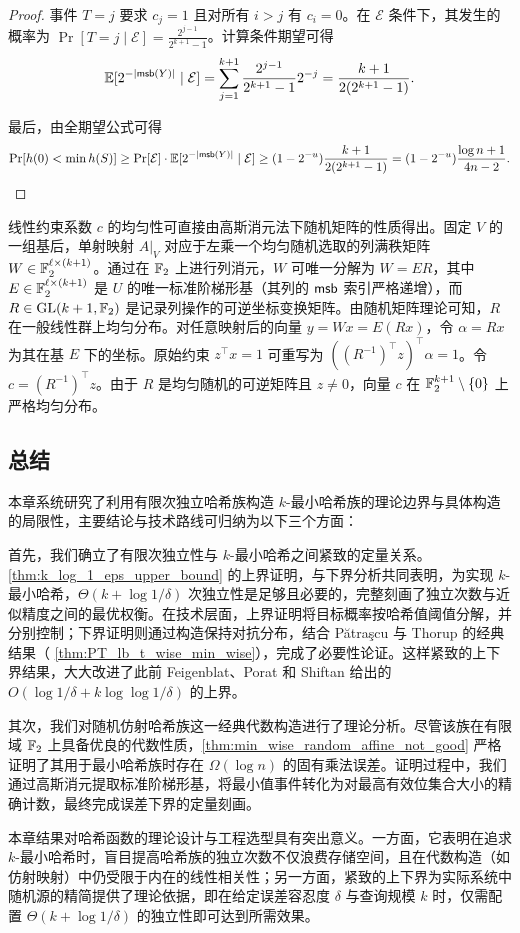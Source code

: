 \begin{proof}
    事件 $T = j$ 要求 $c_j = 1$ 且对所有 $i > j$ 有 $c_i = 0$。在 $\mathcal{E}$ 条件下，其发生的概率为 $\Pr[T = j \mid \mathcal{E}] = \frac{2^{j-1}}{2^{k+1}-1}$。计算条件期望可得
    $$
    \operatorname*{\mathbb{E}}[2^{-|\mathsf{msb}(Y)|} \mid \mathcal{E}] = \sum_{j=1}^{k+1} \frac{2^{j-1}}{2^{k+1}-1} 2^{-j} = \frac{k+1}{2(2^{k+1}-1)}.
    $$
    
    最后，由全期望公式可得
    $$
    \Pr[h(0) < \min h(S)] \ge \Pr[\mathcal{E}] \cdot \operatorname*{\mathbb{E}}[2^{-|\mathsf{msb}(Y)|} \mid \mathcal{E}] \ge (1 - 2^{-u}) \frac{k+1}{2(2^{k+1}-1)} = (1 - 2^{-u}) \frac{\log n + 1}{4 n - 2}.
    $$
\end{proof}

\begin{remark}\label{rmk:QR_induce_constraint_uniform}
    线性约束系数 $c$ 的均匀性可直接由高斯消元法下随机矩阵的性质得出。固定 $V$ 的一组基后，单射映射 $A|_V$ 对应于左乘一个均匀随机选取的列满秩矩阵 $W \in \mathbb{F}_2^{\ell \times (k+1)}$。通过在 $\mathbb{F}_2$ 上进行列消元，$W$ 可唯一分解为 $W = E R$，其中 $E \in \mathbb{F}_2^{\ell \times (k+1)}$ 是 $U$ 的唯一标准阶梯形基（其列的 $\mathsf{msb}$ 索引严格递增），而 $R \in \mathrm{GL}(k+1, \mathbb{F}_2)$ 是记录列操作的可逆坐标变换矩阵。由随机矩阵理论可知，$R$ 在一般线性群上均匀分布。对任意映射后的向量 $y = Wx = E(Rx)$，令 $\alpha = Rx$ 为其在基 $E$ 下的坐标。原始约束 $z^\top x = 1$ 可重写为 $((R^{-1})^\top z)^\top \alpha = 1$。令 $c = (R^{-1})^\top z$。由于 $R$ 是均匀随机的可逆矩阵且 $z \neq 0$，向量 $c$ 在 $\mathbb{F}_2^{k+1} \setminus \{0\}$ 上严格均匀分布。
\end{remark}

\subsection{总结}

本章系统研究了利用有限次独立哈希族构造 $k$-最小哈希族的理论边界与具体构造的局限性，主要结论与技术路线可归纳为以下三个方面：

首先，我们确立了有限次独立性与 $k$-最小哈希之间紧致的定量关系。\cref{thm:k_log_1_eps_upper_bound} 的上界证明，与下界分析共同表明，为实现 $k$-最小哈希，$\Theta(k + \log 1 / \delta)$ 次独立性是足够且必要的，完整刻画了独立次数与近似精度之间的最优权衡。在技术层面，上界证明将目标概率按哈希值阈值分解，并分别控制；下界证明则通过构造保持对抗分布，结合 P{\u{a}}tra{\c{s}}cu 与 Thorup \cite{PT_lb_t_wise_min_wise}的经典结果（ \cref{thm:PT_lb_t_wise_min_wise}），完成了必要性论证。这样紧致的上下界结果，大大改进了此前 Feigenblat、Porat 和 Shiftan \cite{minwise_FPS11} 给出的 $O(\log 1 / \delta + k \log \log 1 / \delta)$ 的上界。

其次，我们对随机仿射哈希族这一经典代数构造进行了理论分析。尽管该族在有限域 $\mathbb{F}_2$ 上具备优良的代数性质，\cref{thm:min_wise_random_affine_not_good} 严格证明了其用于最小哈希族时存在 $\Omega(\log n)$ 的固有乘法误差。证明过程中，我们通过高斯消元提取标准阶梯形基，将最小值事件转化为对最高有效位集合大小的精确计数，最终完成误差下界的定量刻画。

本章结果对哈希函数的理论设计与工程选型具有突出意义。一方面，它表明在追求 $k$-最小哈希时，盲目提高哈希族的独立次数不仅浪费存储空间，且在代数构造（如仿射映射）中仍受限于内在的线性相关性；另一方面，紧致的上下界为实际系统中随机源的精简提供了理论依据，即在给定误差容忍度 $\delta$ 与查询规模 $k$ 时，仅需配置 $\Theta(k + \log 1 / \delta)$ 的独立性即可达到所需效果。